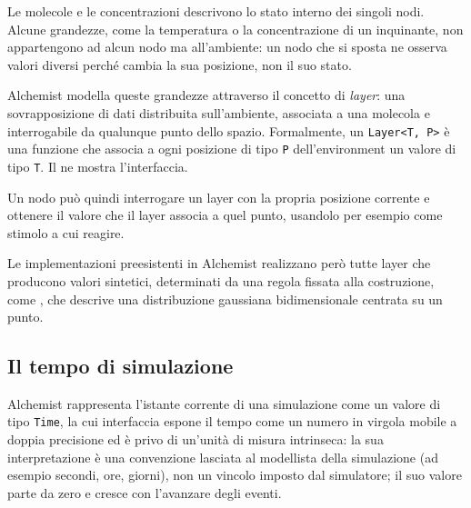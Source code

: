 Le molecole e le concentrazioni descrivono lo stato interno dei singoli nodi. Alcune
grandezze, come la temperatura o la concentrazione di un inquinante, non appartengono
ad alcun nodo ma all'ambiente: un nodo che si sposta ne osserva valori diversi perché
cambia la sua posizione, non il suo stato.

Alchemist modella queste grandezze attraverso il concetto di \emph{layer}: una
sovrapposizione di dati distribuita sull'ambiente, associata a una molecola e
interrogabile da qualunque punto dello spazio. Formalmente, un \texttt{Layer<T, P>} è
una funzione che associa a ogni posizione di tipo \texttt{P} dell'environment un
valore di tipo \texttt{T}. Il  ne mostra l'interfaccia.



Un nodo può quindi interrogare un
layer con la propria posizione corrente e ottenere il valore che il layer associa a
quel punto, usandolo per esempio come stimolo a cui reagire.

Le implementazioni preesistenti in Alchemist realizzano però tutte layer
che producono valori sintetici, determinati da una regola fissata alla costruzione, come
, che descrive una distribuzione
gaussiana bidimensionale centrata su un punto.

\subsection{Il tempo di simulazione}
\label{subsec:alchemist-time}

Alchemist rappresenta l'istante corrente di una simulazione come un valore di tipo
\texttt{Time}, la cui interfaccia espone il tempo come un numero in virgola mobile a doppia
precisione ed è privo di un'unità di misura intrinseca: la sua interpretazione è una
convenzione lasciata al modellista della simulazione (ad esempio secondi, ore,
giorni), non un vincolo imposto dal simulatore; il suo valore parte da zero e cresce
con l'avanzare degli eventi.


